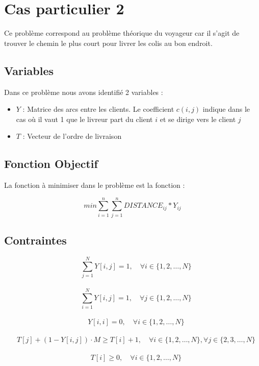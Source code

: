 \section{Cas particulier 2}
Ce problème correspond au problème théorique du voyageur car il s'agit de trouver le chemin le plus court pour livrer les colis au bon endroit.



\subsection{Variables}
Dans ce problème nous avons identifié 2 variables :
\begin{itemize}
\item $Y$ : Matrice des arcs entre les clients. Le coefficient $c(i,j)$ indique  dans le cas où il vaut 1 que le livreur part du client $i$ et se dirige vers le client $j$
\item $T$ : Vecteur de l'ordre de livraison
\end{itemize}

\subsection{Fonction Objectif}

La fonction à minimiser dans le problème est la fonction :

$$ min \sum_{i=1}^{n}\sum_{j=1}^{n}  DISTANCE_{ij} * Y_{ij}$$

\subsection{Contraintes}

$$ \quad \sum\limits_{j=1}^{N} Y[i,j] = 1, \quad \forall i \in \{1,2,\ldots,N\}$$ \\

$$ \quad \sum\limits_{i=1}^{N} Y[i,j] = 1, \quad \forall j \in \{1,2,\ldots,N\}$$ \\
$$\quad Y[i,i] = 0, \quad \forall i \in \{1,2,\ldots,N\}$$ \\
$$ \quad T[j] + (1 - Y[i,j]) \cdot M \geq T[i] + 1, \quad \forall i \in \{1,2,\ldots,N\}, \forall j \in \{2,3,\ldots,N\}$$\\
$$ \quad T[i] \geq 0, \quad \forall i \in \{1,2,\ldots,N\}$$



